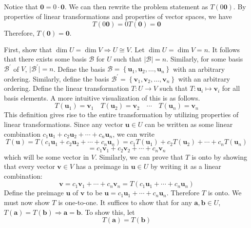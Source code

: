 \documentclass[12pt, letterpaper]{article}
\begin{document}
\begin{solution}
    Notice that \(\mathbf{0}=0 \cdot\mathbf{0}\). We can then rewrite the problem statement as \(T(0 \mathbf{0})\). By properties of linear transformations and properties of vector spaces, we have 
    \[
        T(0\mathbf{0})=0T(\mathbf{0})=\mathbf{0}
    \]
    Therefore, \(T(\mathbf{0})=\mathbf{0}\).
\end{solution}
\begin{solution}
    First, show that \(\dim U =\dim V \Longrightarrow U\cong V\). Let \(\dim U=\dim V=n\). It follows that there exists some basis \(\mathcal{B}\) for \(U\) such that \(\vert \mathcal{B}  \vert =n \). Similarly, for some basis \(\mathcal{B} ^{\prime} \) of \(V\), \(\vert \mathcal{B} ^{\prime}  \vert=n \). Define the basis \(\mathcal{B} =\left\{ \mathbf{u}_1,\mathbf{u}_2,\ldots,\mathbf{u}_n \right\} \) with an arbitrary ordering. Similarly, define the basis \(\mathcal{B} ^{\prime} =\left\{ \mathbf{v}_1,\mathbf{v}_2,\ldots,\mathbf{v}_n \right\} \) with an arbitrary ordering. Define the linear transformation \(T:U\to V\) such that \(T:\mathbf{u}_i \mapsto \mathbf{v}_i\) for all basis elements. A more intuitive visualization of this is as follows.
    \[
        T(\mathbf{u}_1)=\mathbf{v}_1\quad T(\mathbf{u}_2)=\mathbf{v}_2\quad\cdots\quad T(\mathbf{u}_n)=\mathbf{v}_n
    \]
    This definition gives rise to the entire transformation by utilizing properties of linear transformations. Since any vector \(\mathbf{u}\in U\) can be written as some linear combination \(c_1 \mathbf{u}_1 + c_2 \mathbf{u}_2 + \cdots + c_n \mathbf{u}_n\), we can write 
    \[
        T(\mathbf{u})=T(c_1 \mathbf{u}_1 + c_2 \mathbf{u}_2 + \cdots + c_n \mathbf{u}_n)=c_1 T(\mathbf{u}_1) + c_2 T(\mathbf{u}_2)+\cdots+c_n T(\mathbf{u}_n)
    \]
    \[
        =c_1 \mathbf{v}_1 + c_2 \mathbf{v}_{2}+  \cdots + c_n \mathbf{v}_n
    \]
    which will be some vector in \(V\). Similarly, we can prove that \(T\) is onto by showing that every vector \(\mathbf{v}\in V\)  has a preimage in \(\mathbf{u}\in U\) by writing it as a linear combination:
    \[
        \mathbf{v} = c_1 \mathbf{v}_1 + \cdots + c_n \mathbf{v}_n = T(c_1 \mathbf{u}_1 + \cdots + c_n \mathbf{u}_n)
    \]
    Define the preimage \(\mathbf{u}\) of \(\mathbf{v}\) to be \(\mathbf{u}=c_1 \mathbf{u}_1 + \cdots + c_n \mathbf{u}_n\). Therefore \(T\) is onto. We must now show \(T\) is one-to-one. It suffices to show that for any \(\mathbf{a},\mathbf{b}\in U\), \(T(\mathbf{a})=T(\mathbf{b})\Longrightarrow \mathbf{a}=\mathbf{b}\). To show this, let 
    \[
        T(\mathbf{a})=T(\mathbf{b})
\]
\end{solution}
\end{document}
